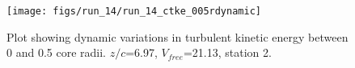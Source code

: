 \begin{figure}[H]
\centering
\texttt{[image: figs/run\_14/run\_14\_ctke\_005rdynamic]}
\caption{Plot showing dynamic variations in turbulent kinetic energy between 0 and 0.5 core radii. $z/c$=6.97, $V_{free}$=21.13, station 2.}
\label{fig:run_14_ctke_005rdynamic}
\end{figure}


